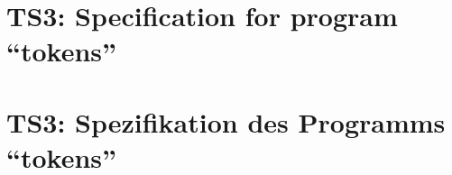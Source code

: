 \parindent0pt

\thispagestyle{empty}
\ifenglish
\section*{TS3: Specification for program ``tokens''}

\fi
\ifgerman
\section*{TS3: Spezifikation des Programms ``tokens''}

\fi


